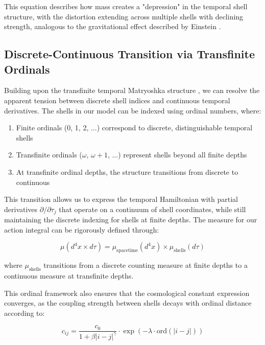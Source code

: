 \documentclass[12pt,a4paper]{article}
\begin{document}
This equation describes how mass creates a "depression" in the temporal shell structure, with the distortion extending across multiple shells with declining strength, analogous to the gravitational effect described by Einstein \citep{einstein}.

\subsection{Discrete-Continuous Transition via Transfinite Ordinals}

Building upon the transfinite temporal Matryoshka structure \citep{matryoshka}, we can resolve the apparent tension between discrete shell indices and continuous temporal derivatives. The shells in our model can be indexed using ordinal numbers, where:

\begin{enumerate}
    \item Finite ordinals (0, 1, 2, ...) correspond to discrete, distinguishable temporal shells
    \item Transfinite ordinals ($\omega$, $\omega+1$, ...) represent shells beyond all finite depths
    \item At transfinite ordinal depths, the structure transitions from discrete to continuous
\end{enumerate}

This transition allows us to express the temporal Hamiltonian with partial derivatives $\partial/\partial\tau_j$ that operate on a continuum of shell coordinates, while still maintaining the discrete indexing for shells at finite depths. The measure for our action integral can be rigorously defined through:

\begin{equation}
\mu(d^4x \times d\tau) = \mu_{\text{spacetime}}(d^4x) \times \mu_{\text{shells}}(d\tau)
\end{equation}

where $\mu_{\text{shells}}$ transitions from a discrete counting measure at finite depths to a continuous measure at transfinite depths.

This ordinal framework also ensures that the cosmological constant expression converges, as the coupling strength between shells decays with ordinal distance according to:

\begin{equation}
c_{ij} = \frac{c_0}{1 + \beta |i-j|^\gamma} \cdot \exp(-\lambda \cdot \text{ord}(|i-j|))
\end{equation}
\end{document}
